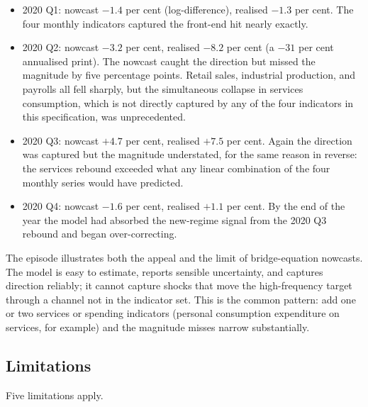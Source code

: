 \begin{itemize}
\tightlist
\item
  2020 Q1: nowcast \(-1.4\) per cent (log-difference), realised \(-1.3\)
  per cent. The four monthly indicators captured the front-end hit
  nearly exactly.
\item
  2020 Q2: nowcast \(-3.2\) per cent, realised \(-8.2\) per cent (a
  \(-31\) per cent annualised print). The nowcast caught the direction
  but missed the magnitude by five percentage points. Retail sales,
  industrial production, and payrolls all fell sharply, but the
  simultaneous collapse in services consumption, which is not directly
  captured by any of the four indicators in this specification, was
  unprecedented.
\item
  2020 Q3: nowcast \(+4.7\) per cent, realised \(+7.5\) per cent. Again
  the direction was captured but the magnitude understated, for the same
  reason in reverse: the services rebound exceeded what any linear
  combination of the four monthly series would have predicted.
\item
  2020 Q4: nowcast \(-1.6\) per cent, realised \(+1.1\) per cent. By the
  end of the year the model had absorbed the new-regime signal from the
  2020 Q3 rebound and began over-correcting.
\end{itemize}

The episode illustrates both the appeal and the limit of bridge-equation
nowcasts. The model is easy to estimate, reports sensible uncertainty,
and captures direction reliably; it cannot capture shocks that move the
high-frequency target through a channel not in the indicator set. This
is the common pattern: add one or two services or spending indicators
(personal consumption expenditure on services, for example) and the
magnitude misses narrow substantially.

\subsection{Limitations}\label{limitations}

Five limitations apply.

